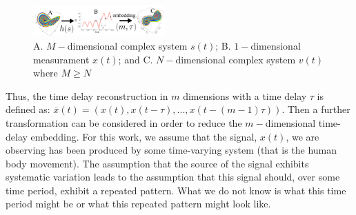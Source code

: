 \begin{figure}[!htb]
\centering
\includegraphics[width=0.45\textwidth]{figures/reconstructed_state_space/fig}
\caption[PA]{A. $M-$dimensional complex system $s(t)$; B. $1-$dimensional measurament
$x(t)$; and  C. $N-$dimensional complex system $v(t)$ where $M \geq N $}
\label{fig:takens_theorem}
\end{figure}

Thus, the time delay reconstruction in $m$ dimensions with a time delay
$\tau$ is defined as:
$\overline{x}(t) = (x(t), x(t-\tau),...,x(t-(m-1)\tau))$.
Then a further transformation can be considered
in order to reduce
the $m-$dimensional time-delay embedding.
For this work, we assume that the signal, $x(t)$, we are observing has been
produced by some time-varying system (that is the human body movement).
The assumption that the source of the signal exhibits systematic variation
leads to the assumption that this signal should, over some time period,
exhibit a repeated pattern. What we do not know is what this time period might
be or what this repeated pattern might look like.


%



